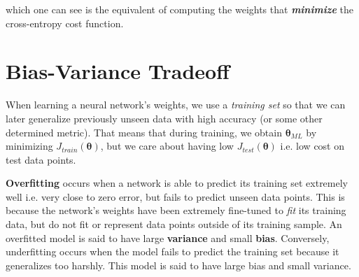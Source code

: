 which one can see is the equivalent of computing the weights that \textbf{\textit{minimize}} the cross-entropy cost function.




\section{Bias-Variance Tradeoff}
When learning a neural network's weights, we use a \textit{training set} so that we can later generalize
previously unseen data with high accuracy (or some other determined metric). That means that during training, we
obtain $\bm{\theta}_{ML}$ by minimizing $J_{train}(\bm{\theta})$, but we care about having low $J_{test}(\bm{\theta})$ i.e. low cost
on test data points.

\textbf{Overfitting} occurs when a network is able to predict its training set extremely well i.e. very close to zero error, but fails to predict
unseen data points. This is because the network's weights have been extremely fine-tuned to \textit{fit} its training data, but do not fit or represent
data points outside of its training sample.
An overfitted model is said to have large \textbf{variance} and small \textbf{bias}. Conversely, underfitting occurs when the model fails to predict
the training set because it generalizes too harshly. This model is said to have large bias and small variance.

